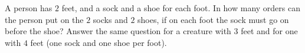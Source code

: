 A person has $2$ feet, and a sock and a shoe for each foot. In how many orders can the person put on the $2$ socks and $2$ shoes, if on each foot the sock must go on before the shoe? Answer the same question for a creature with $3$ feet and for one with $4$ feet (one sock and one shoe per foot).
